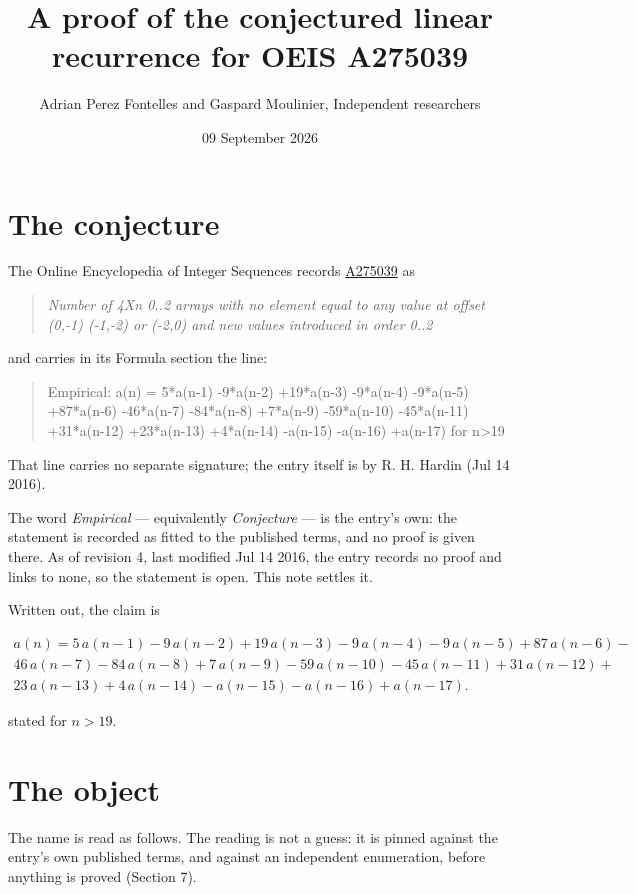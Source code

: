 \documentclass[11pt]{article}
\title{A proof of the conjectured linear recurrence for OEIS A275039}
\author{Adrian Perez Fontelles and Gaspard Moulinier, Independent researchers}
\date{09 September 2026}
\theoremstyle{definition}
\begin{document}
\maketitle
\section{The conjecture}

The Online Encyclopedia of Integer Sequences records \href{https://oeis.org/A275039}{A275039} as

\begin{quote}\itshape Number of 4Xn 0..2 arrays with no element equal to any value at offset (0,-1) (-1,-2) or (-2,0) and new values introduced in order 0..2\end{quote}

and carries in its Formula section the line:

\begin{quote}\ttfamily Empirical: a(n) = 5*a(n-1) -9*a(n-2) +19*a(n-3) -9*a(n-4) -9*a(n-5) +87*a(n-6) -46*a(n-7) -84*a(n-8) +7*a(n-9) -59*a(n-10) -45*a(n-11) +31*a(n-12) +23*a(n-13) +4*a(n-14) -a(n-15) -a(n-16) +a(n-17) for n>19\end{quote}

That line carries no separate signature; the entry itself is by R. H. Hardin (Jul 14 2016).

The word {\itshape Empirical} --- equivalently {\itshape Conjecture} --- is the entry's own: the statement is recorded as fitted to the published terms, and no proof is given there. As of revision 4, last modified Jul 14 2016, the entry records no proof and links to none, so the statement is open. This note settles it.

Written out, the claim is

\begin{multline*} a(n) = 5\,a(n-1) - 9\,a(n-2) + 19\,a(n-3) - 9\,a(n-4) - 9\,a(n-5) + 87\,a(n-6) - \\ 46\,a(n-7) - 84\,a(n-8) + 7\,a(n-9) - 59\,a(n-10) - 45\,a(n-11) + 31\,a(n-12) + \\ 23\,a(n-13) + 4\,a(n-14) - a(n-15) - a(n-16) + a(n-17). \end{multline*}

stated for $n > 19$.

\section{The object}

The name is read as follows. The reading is not a guess: it is pinned against the entry's own published terms, and against an independent enumeration, before anything is proved (Section 7).
\end{document}
